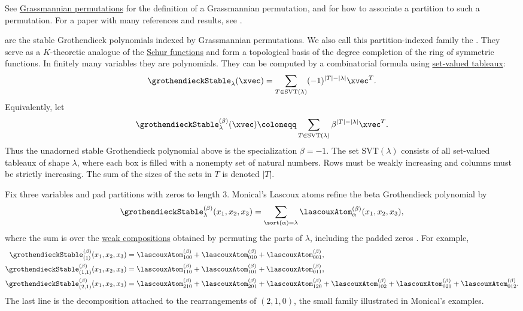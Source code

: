 See \hyperref[grassmannianPermutation]{Grassmannian permutations} for the
definition of a Grassmannian permutation, and for how to associate a partition
to such a permutation.
For a paper with many references and results, see \cite{MonicalPechenikScrimshaw2018}.


\label{grassmannGrothendieckPolynomialDefinition}
are the stable Grothendieck polynomials indexed by Grassmannian permutations.
We also call this partition-indexed family the
. They serve as a $K$-theoretic
analogue of the \hyperref[schurS]{Schur functions} and form a topological
basis of the degree completion of the ring of symmetric functions.
In finitely many variables they are polynomials.
They can be computed by a combinatorial formula using
\hyperref[setValuedTableaux]{set-valued tableaux}:
\begin{align}
\grothendieckStable_\lambda(\xvec) = \sum_{T \in \mathrm{SVT}(\lambda)} (-1)^{|T|-|\lambda|} \xvec^T.
\end{align}
Equivalently, let
\[
\grothendieckStable^{(\beta)}_\lambda(\xvec)
\coloneqq
\sum_{T \in \mathrm{SVT}(\lambda)}
\beta^{|T|-|\lambda|}\xvec^T.
\]
Thus the unadorned stable Grothendieck polynomial above is the specialization
\(\beta=-1\).
The set $\mathrm{SVT}(\lambda)$ consists of all set-valued tableaux of shape
$\lambda$, where each box is filled with a nonempty set of natural numbers.
Rows must be weakly increasing and columns must be strictly increasing.
The sum of the sizes of the sets in $T$ is denoted $|T|$.

\begin{example*}
Fix three variables and pad partitions with zeros to length \(3\).
Monical's Lascoux atoms refine the beta Grothendieck polynomial by
\[
  \grothendieckStable^{(\beta)}_\lambda(x_1,x_2,x_3)
  =
  \sum_{\sort(\alpha)=\lambda}
  \lascouxAtom^{(\beta)}_\alpha(x_1,x_2,x_3),
\]
where the sum is over the \hyperref[weakCompositionDefinition]{weak
compositions} obtained by permuting the parts of
\(\lambda\), including the padded zeros \cite[Thm.~1.2]{Monical2017}.
For example,
\begin{align*}
\grothendieckStable^{(\beta)}_{(1)}(x_1,x_2,x_3)
&=
\lascouxAtom^{(\beta)}_{100}
+\lascouxAtom^{(\beta)}_{010}
+\lascouxAtom^{(\beta)}_{001},\\
\grothendieckStable^{(\beta)}_{(1,1)}(x_1,x_2,x_3)
&=
\lascouxAtom^{(\beta)}_{110}
+\lascouxAtom^{(\beta)}_{101}
+\lascouxAtom^{(\beta)}_{011},\\
\grothendieckStable^{(\beta)}_{(2,1)}(x_1,x_2,x_3)
&=
\lascouxAtom^{(\beta)}_{210}
+\lascouxAtom^{(\beta)}_{201}
+\lascouxAtom^{(\beta)}_{120}
+\lascouxAtom^{(\beta)}_{102}
+\lascouxAtom^{(\beta)}_{021}
+\lascouxAtom^{(\beta)}_{012}.
\end{align*}
The last line is the decomposition attached to the rearrangements of
\((2,1,0)\), the small family illustrated in Monical's examples.
\end{example*}

